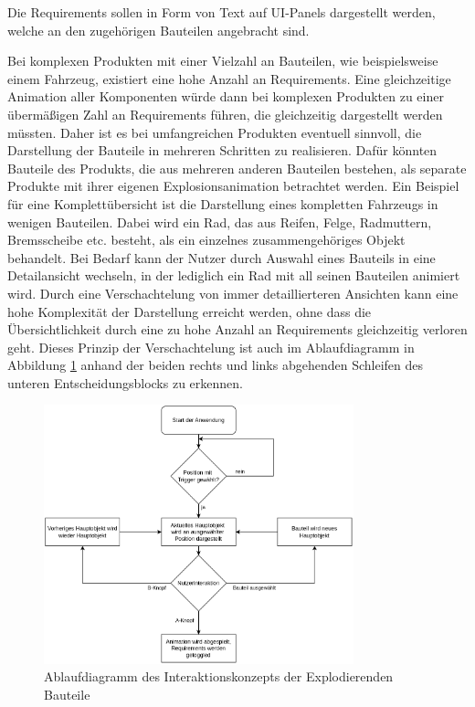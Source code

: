 Die Requirements sollen in Form von Text auf UI-Panels dargestellt werden, welche an den zugehörigen Bauteilen angebracht sind.


Bei komplexen Produkten mit einer Vielzahl an Bauteilen, wie beispielsweise einem Fahrzeug, existiert eine hohe Anzahl an Requirements.
Eine gleichzeitige Animation aller Komponenten würde dann bei komplexen Produkten zu einer übermäßigen Zahl an Requirements führen, die gleichzeitig dargestellt werden müssten.
Daher ist es bei umfangreichen Produkten eventuell sinnvoll, die Darstellung der Bauteile in mehreren Schritten zu realisieren.
Dafür könnten Bauteile des Produkts, die aus mehreren anderen Bauteilen bestehen, als separate Produkte mit ihrer eigenen Explosionsanimation betrachtet werden.
Ein Beispiel für eine Komplettübersicht ist die Darstellung eines kompletten Fahrzeugs in wenigen Bauteilen.
Dabei wird ein Rad, das aus Reifen, Felge, Radmuttern, Bremsscheibe etc. besteht, als ein einzelnes zusammengehöriges Objekt behandelt.
Bei Bedarf kann der Nutzer durch Auswahl eines Bauteils in eine Detailansicht wechseln, in der lediglich ein Rad mit all seinen Bauteilen animiert wird.
Durch eine Verschachtelung von immer detaillierteren Ansichten kann eine hohe Komplexität der Darstellung erreicht werden, ohne dass die Übersichtlichkeit durch eine zu hohe Anzahl an Requirements gleichzeitig verloren geht.
Dieses Prinzip der Verschachtelung ist auch im Ablaufdiagramm in Abbildung \ref{fig:explosions-ablauf} anhand der beiden rechts und links abgehenden Schleifen des unteren Entscheidungsblocks zu erkennen.

\begin{figure}[H]
  \centering
  \includegraphics[width=0.8\textwidth]{images/ExplosionAblauf.png}
  \caption{Ablaufdiagramm des Interaktionskonzepts der Explodierenden Bauteile}
  \label{fig:explosions-ablauf}
\end{figure}

